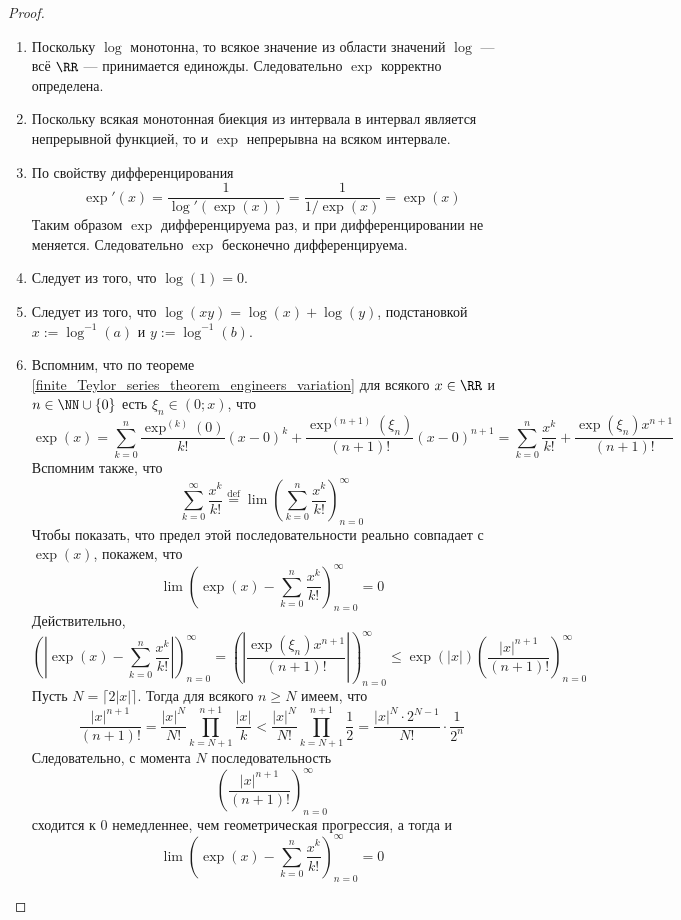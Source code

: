\documentclass[12pt,a4paper]{article}
\begin{document}
    \begin{proof}\ 
        \begin{enumerate}
            \item Поскольку $\log$ монотонна, то всякое значение из области значений $\log$ --- всё $\RR$ --- принимается единожды. Следовательно $\exp$ корректно определена.
            \item Поскольку всякая монотонная биекция из интервала в интервал является непрерывной функцией, то и $\exp$ непрерывна на всяком интервале.
            \item По свойству дифференцирования
                \[\exp'(x) = \frac{1}{\log'(\exp(x))} = \frac{1}{1/\exp(x)} = \exp(x)\]
                Таким образом $\exp$ дифференцируема раз, и при дифференцировании не меняется. Следовательно $\exp$ бесконечно дифференцируема.
            \item Следует из того, что $\log(1) = 0$.
            \item Следует из того, что $\log(xy) = \log(x) + \log(y)$, подстановкой $x := \log^{-1}(a)$ и $y := \log^{-1}(b)$.
            \item Вспомним, что по теореме \ref{finite_Teylor_series_theorem_engineers_variation} для всякого $x \in \RR$ и $n \in \NN \cup \{0\}$ есть $\xi_n \in (0; x)$, что
                \[
                    \exp(x)
                    = \sum_{k=0}^n \frac{\exp^{(k)}(0)}{k!}(x-0)^k + \frac{\exp^{(n+1)}(\xi_n)}{(n+1)!}(x-0)^{n+1}
                    = \sum_{k=0}^n \frac{x^k}{k!} + \frac{\exp(\xi_n)x^{n+1}}{(n+1)!}
                \]
                Вспомним также, что
                \[
                    \sum_{k=0}^\infty \frac{x^k}{k!} \stackrel{\mathrm{def}}{=} \lim \left(\sum_{k=0}^n \frac{x^k}{k!}\right)_{n=0}^\infty
                \]
                Чтобы показать, что предел этой последовательности реально совпадает с $\exp(x)$, покажем, что
                \[\lim \left(\exp(x) - \sum_{k=0}^n \frac{x^k}{k!}\right)_{n=0}^\infty = 0\]
                Действительно,
                \[
                    \left(\left|\exp(x) - \sum_{k=0}^n \frac{x^k}{k!}\right|\right)_{n=0}^\infty
                    = \left(\left|\frac{\exp(\xi_n)x^{n+1}}{(n+1)!}\right|\right)_{n=0}^\infty
                    \leqslant \exp(|x|) \left(\frac{|x|^{n+1}}{(n+1)!}\right)_{n=0}^\infty
                \]
                Пусть $N = \lceil 2|x| \rceil$. Тогда для всякого $n \geqslant N$ имеем, что
                \[
                    \frac{|x|^{n+1}}{(n+1)!}
                    = \frac{|x|^N}{N!} \prod_{k=N+1}^{n+1} \frac{|x|}{k}
                    < \frac{|x|^N}{N!} \prod_{k=N+1}^{n+1} \frac{1}{2}
                    = \frac{|x|^N\cdot 2^{N-1}}{N!} \cdot \frac{1}{2^n}
                \]
                Следовательно, с момента $N$ последовательность
                \[\left(\frac{|x|^{n+1}}{(n+1)!}\right)_{n=0}^\infty\]
                сходится к $0$ немедленнее, чем геометрическая прогрессия, а тогда и
                \[\lim \left(\exp(x) - \sum_{k=0}^n \frac{x^k}{k!}\right)_{n=0}^\infty = 0\]
        \end{enumerate}
    \end{proof}
\end{document}
